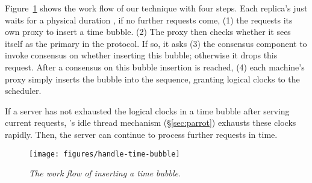 Figure~\ref{fig:handlebubble} shows the work flow of our \timealgo technique 
with four steps. Each replica's \dmt just waits for a physical duration 
\ntimeout, if no further requests come, (1) the \dmt requests its own proxy to 
insert a time bubble. (2) The proxy then checks whether it sees itself as the 
primary in the \paxos protocol. If so, it asks (3) the consensus component to 
invoke consensus on whether inserting this bubble; otherwise it drops this 
request. After a consensus on this bubble insertion is reached, (4) each 
machine's proxy simply inserts the bubble into the \paxos sequence, granting 
\nclock logical clocks to the \dmt scheduler.


If a server has not exhausted the logical clocks in a time bubble after 
serving current requests, \parrot's idle thread mechanism 
(\S\ref{sec:parrot}) exhausts these clocks rapidly. 
Then, the server can continue to process further requests in time.

\begin{figure}[t]
\centering
\texttt{[image: figures/handle-time-bubble]}
\vspace{-.30in}
\caption{{\em The work flow of inserting a time bubble.}} 
\label{fig:handlebubble}
\vspace{-.1in}
\end{figure}



